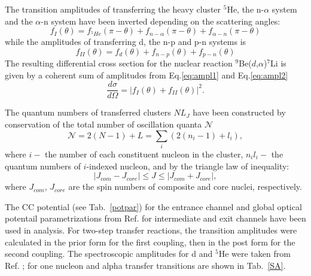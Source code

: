 \documentclass[10pt]{iopart}
\begin{document}
The transition amplitudes of transferring  the heavy cluster $^5$He, the n-$\alpha$ system and the $\alpha$-n system have been inverted depending on the scattering angles:
\begin{equation}
\label{eq:ampl1}
f_{I}(\theta)=f_{^5He}(\pi - \theta) + f_{n-\alpha}(\pi - \theta) + f_{\alpha-n}(\pi - \theta) 
\end{equation}
while the amplitudes of transferring  d, the n-p  and  p-n systems is
\begin{equation}
\label{eq:ampl2}
f_{II}(\theta)=f_{d}(\theta) + f_{n-p}( \theta) + f_{p-n}(\theta) 
\end{equation} 
The resulting differential cross section for the nuclear reaction ${^9}$Be($d$,$\alpha$)$^7$Li is given by a coherent sum of amplitudes from Eq.\ref{eq:ampl1} and Eq.\ref{eq:ampl2}
\begin{equation}
\frac{d\sigma}{d\Omega}=\vert f_{I}(\theta) + f_{II}(\theta) \vert ^2.
\end{equation}

The quantum numbers of transferred clusters $NL_J$ have been constructed by conservation of the total number of oscillation quanta $\mathcal{N}$ \cite{satchler1983}
\begin{equation}
\mathcal{N} =2(N-1)+L=\sum_{i} \left( 2 \left( n_i -1 \right) + l_i \right),
\end{equation}
where $i -$ the number of each constituent nucleon in the cluster, $n_i l_i -$ the quantum numbers of $i$-indexed nucleon,
and by the triangle law of inequality:
\begin{equation}
\vert {J}_{com} - {J}_{core} \vert \le {J} \le \vert {J}_{com} + {J}_{core} \vert,
\end{equation}
where $J_{com}$, $J_{core}$ are the spin numbers of composite and core nuclei, respectively. 

 The CC potential (see Tab.~\ref{potpar}) for the entrance channel and global optical potentail parametrizations from Ref. \cite{globalTriton, globalAlpha, global6Li} for intermediate and exit channels have been used in analysis. For two-step transfer reactions, the transition amplitudes were calculated in the prior form for the first coupling, then in the post form for the second coupling. The spectroscopic amplitudes for d and $^5$He were taken from Ref. \cite{fiveSA}; for one nucleon and alpha transfer transitions are shown in Tab.~\ref{SA}.
 
\end{document}
